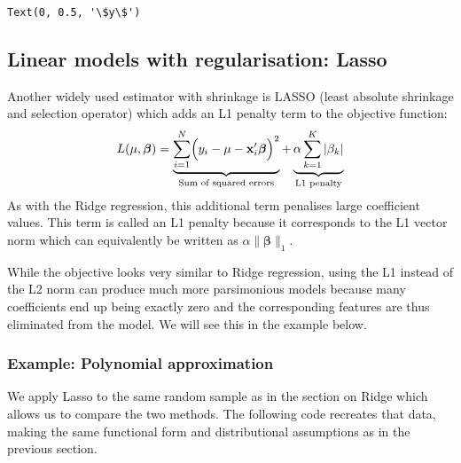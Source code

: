 \documentclass{scrartcl}
\makeatletter
\newcommand{\boxspacing}{\kern\kvtcb@left@rule\kern\kvtcb@boxsep}
\newcommand{\prompt}[4]{
        {\ttfamily\llap{{\color{#2}[#3]:\hspace{3pt}#4}}\vspace{-\baselineskip}}
    }
\makeatother
\begin{document}
            \begin{tcolorbox}[breakable, size=fbox, boxrule=.5pt, pad at break*=1mm, opacityfill=0]
\prompt{Out}{outcolor}{45}{\boxspacing}
\begin{Verbatim}[commandchars=\\\{\}]
Text(0, 0.5, '\$y\$')
\end{Verbatim}
\end{tcolorbox}
        
    \begin{center}
    \end{center}
    

\hypertarget{linear-models-with-regularisation-lasso}{%
\subsection{Linear models with regularisation:
Lasso}\label{linear-models-with-regularisation-lasso}}

Another widely used estimator with shrinkage is LASSO (least absolute
shrinkage and selection operator) which adds an L1 penalty term to the
objective function: \[
L(\mu, \bm\beta) = 
    \underbrace{\sum_{i=1}^N \Bigl(
    y_i - \mu - \mathbf{x}_i'\bm\beta\Bigr)^2}_{\text{Sum of squared errors}}
    + 
    \underbrace{\alpha \sum_{k=1}^K |\beta_k|}_{\text{L1 penalty}}
\] As with the Ridge regression, this additional term penalises large
coefficient values. This term is called an L1 penalty because it
corresponds to the L1 vector norm which can equivalently be written as
\(\alpha \|\bm\beta\|_1\).

While the objective looks very similar to Ridge regression, using the L1
instead of the L2 norm can produce much more parsimonious models because
many coefficients end up being exactly zero and the corresponding
features are thus eliminated from the model. We will see this in the
example below.

    \hypertarget{example-polynomial-approximation}{%
\vspace{1em}\subsubsection{Example: Polynomial
approximation}\label{example-polynomial-approximation}}

We apply Lasso to the same random sample as in the section on Ridge
which allows us to compare the two methods. The following code recreates
that data, making the same functional form and distributional
assumptions as in the previous section.
\end{document}
